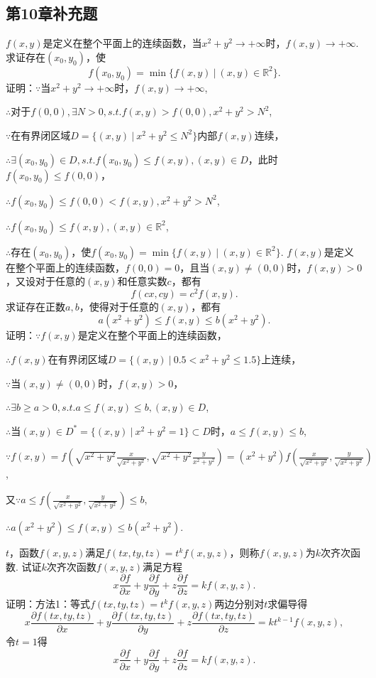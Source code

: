 \documentclass[12pt,UTF8]{ctexart}
\newcommand\Set[2]{\{#1\ \vert\ #2 \}}
\begin{document}
\subsection{第10章补充题}
\begin{enumerate}
$f(x,y)$是定义在整个平面上的连续函数，当$x^2+y^2\rightarrow+\infty$时，$f(x,y)\rightarrow+\infty$. 求证存在$(x_0,y_0)$，使
\[
f(x_0,y_0)=\min\Set{f(x,y)}{(x,y)\in\mathbb R^2}.
\]
证明：$\because$当$x^2+y^2\rightarrow+\infty$时，$f(x,y)\rightarrow+\infty$,

$\therefore$对于$f(0,0),\exists N>0,s.t.f(x,y)>f(0,0),x^2+y^2>N^2$,

$\because$在有界闭区域$D=\Set{(x,y)}{x^2+y^2\leq N^2}$内部$f(x,y)$连续，

$\therefore\exists(x_0,y_0)\in D,s.t.f(x_0,y_0)\leq f(x,y),(x,y)\in D$，此时$f(x_0,y_0)\leq f(0,0)$，

$\therefore f(x_0,y_0)\leq f(0,0)<f(x,y),x^2+y^2>N^2$,

$\therefore f(x_0,y_0)\leq f(x,y),(x,y)\in\mathbb R^2$,

$\therefore$存在$(x_0,y_0)$，使$f(x_0,y_0)=\min\Set{f(x,y)}{(x,y)\in\mathbb R^2}$.
$f(x,y)$是定义在整个平面上的连续函数，$f(0,0)=0$，且当$(x,y)\neq(0,0)$时，$f(x,y)>0$，又设对于任意的$(x,y)$和任意实数$c$，都有
\[
f(cx,cy)=c^2f(x,y).
\]
求证存在正数$a,b$，使得对于任意的$(x,y)$，都有
\[
a(x^2+y^2)\leq f(x,y)\leq b(x^2+y^2).
\]
证明：$\because f(x,y)$是定义在整个平面上的连续函数，

$\therefore f(x,y)$在有界闭区域$D=\Set{(x,y)}{0.5<x^2+y^2\leq 1.5}$上连续，

$\because$当$(x,y)\neq(0,0)$时，$f(x,y)>0$，

$\therefore\exists b\geq a>0,s.t.a\leq f(x,y)\leq b,(x,y)\in D$,

$\therefore$当$(x,y)\in D^*=\Set{(x,y)}{x^2+y^2=1}\subset D$时，$a\leq f(x,y)\leq b$,

$\because f(x,y)=f(\sqrt{x^2+y^2}\frac x{\sqrt{x^2+y^2}},\sqrt{x^2+y^2}\frac y{x^2+y^2})=(x^2+y^2)f(\frac x{\sqrt{x^2+y^2}},\frac y{\sqrt{x^2+y^2}})$,

又$\because a\leq f(\frac x{\sqrt{x^2+y^2}},\frac y{\sqrt{x^2+y^2}})\leq b$,

$\therefore a(x^2+y^2)\leq f(x,y)\leq b(x^2+y^2)$.

$t$，函数$f(x,y,z)$满足$f(tx,ty,tz)=t^kf(x,y,z)$，则称$f(x,y,z)$为$k$次齐次函数. 试证$k$次齐次函数$f(x,y,z)$满足方程
\[
x\frac{\partial f}{\partial x}+y\frac{\partial f}{\partial y}+z\frac{\partial f}{\partial z}=kf(x,y,z).
\]
证明：方法1：等式$f(tx,ty,tz)=t^kf(x,y,z)$两边分别对$t$求偏导得
\[
x\frac{\partial f(tx,ty,tz)}{\partial x}+y\frac{\partial f(tx,ty,tz)}{\partial y}+z\frac{\partial f(tx,ty,tz)}{\partial z}=kt^{k-1}f(x,y,z),
\]
令$t=1$得
\[
x\frac{\partial f}{\partial x}+y\frac{\partial f}{\partial y}+z\frac{\partial f}{\partial z}=kf(x,y,z).
\]


\end{enumerate}
\end{document}
